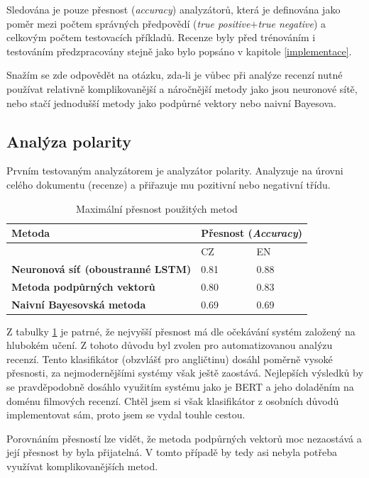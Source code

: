 Sledována je pouze přesnost (\emph{accuracy}) analyzátorů, která je definována jako poměr mezi počtem správných předpovědí (\emph{true positive}$+$\emph{true negative}) a celkovým počtem testovacích příkladů. Recenze byly před trénováním i testováním předzpracovány stejně jako bylo popsáno v kapitole \ref{implementace}. 

Snažím se zde odpovědět na otázku, zda-li je vůbec při analýze recenzí nutné používat relativně komplikovanější a náročnější metody jako jsou neuronové sítě, nebo stačí jednodušší metody jako podpůrné vektory nebo naivní Bayesova.




\subsection{Analýza polarity}

Prvním testovaným analyzátorem je analyzátor polarity. Analyzuje na úrovni celého dokumentu (recenze) a přiřazuje mu pozitivní nebo negativní třídu.
\FloatBarrier
\begin{table}[h!]
  \begin{center}
    \caption{Maximální přesnost použitých metod}
    \label{tab:table1.4}
    \begin{tabular}{l|l|l}
      \textbf{Metoda} &  \multicolumn{2}{l}{\textbf{Přesnost (\emph{Accuracy})}}\\ 
      \hline
      \textbf & CZ & EN \\ 
      \textbf{Neuronová síť (oboustranné LSTM)} & 0.81 & 0.88  \\ 
      \textbf{Metoda podpůrných vektorů} & 0.80 & 0.83 \\ 
      \textbf{Naivní Bayesovská metoda} & 0.69 & 0.69 \\ 
     \end{tabular}
  \end{center}
\end{table}
Z tabulky \ref{tab:table1.4} je patrné, že nejvyšší přesnost má dle očekávání systém založený na hlubokém učení. Z tohoto důvodu byl zvolen pro automatizovanou analýzu recenzí. Tento klasifikátor (obzvlášť pro angličtinu) dosáhl poměrně vysoké přesnosti, za nejmodernějšími systémy však ještě zaostává. Nejlepších výsledků by se pravděpodobně dosáhlo využitím systému jako je BERT a jeho doladěním na doménu filmových recenzí. Chtěl jsem si však klasifikátor z osobních důvodů implementovat sám, proto jsem se vydal touhle cestou.

Porovnáním přesností lze vidět, že metoda podpůrných vektorů moc nezaostává a její přesnost by byla přijatelná. V tomto případě by tedy asi nebyla potřeba využívat komplikovanějších metod.  
\FloatBarrier


